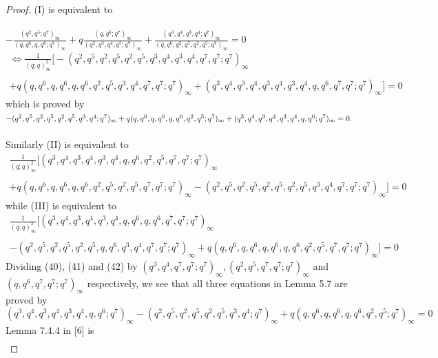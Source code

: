 \documentclass[10pt,reqno]{amsart}
\begin{document}
\begin{proof}
(I) is equivalent to \\ \\$-\displaystyle\frac{(q^2,q^5;q^7)_{\infty}}{(q,q^6,q,q^6;q^7)_{\infty}}+q\displaystyle\frac{(q,q^6;q^7)_{\infty}}{(q^2,q^3,q^4,q^5;q^7)_{\infty}}+\displaystyle\frac{(q^3,q^4,q^3,q^4;q^7)_{\infty}}{(q,q^6,q^2,q^5,q^2,q^5;q^7)_{\infty}}=0$ 
\begin{multline}
\Longleftrightarrow\displaystyle\frac{1}{(q;q)_{\infty}^2}\Bigg[-(q^2,q^5,q^2,q^5,q^2,q^5,q^3,q^4,q^3,q^4,q^7,q^7;q^7)_{\infty}\\ \\+q(q,q^6,q,q^6,q,q^6,q^2,q^5,q^3,q^4,q^7,q^7;q^7)_{\infty}+(q^3,q^4,q^3,q^4,q^3,q^4,q^3,q^4,q,q^6,q^7,q^7;q^7)_{\infty}\Bigg]=0
\end{multline}
which is proved by $-(q^2,q^5,q^2,q^5,q^2,q^5,q^3,q^4;q^7)_{\infty}\\ \\+q(q,q^6,q,q^6,q,q^6,q^2,q^5;q^7)_{\infty}+(q^3,q^4,q^3,q^4,q^3,q^4,q,q^6;q^7)_{\infty}=0.$ \\ \\
Similarly (II) is equivalent to 
\begin{multline}
\displaystyle\frac{1}{(q;q)_{\infty}^2}\Bigg[(q^3,q^4,q^3,q^4,q^3,q^4,q,q^6,q^2,q^5,q^7,q^7;q^7)_{\infty}\\ \\+q(q,q^6,q,q^6,q,q^6,q^2,q^5,q^2,q^5,q^7,q^7;q^7)_{\infty}-(q^2,q^5,q^2,q^5,q^2,q^5,q^2,q^5,q^3,q^4,q^7,q^7;q^7)_{\infty}\Bigg]=0
\end{multline}
while (III) is equivalent to 
\begin{multline}
\displaystyle\frac{1}{(q;q)_{\infty}^2}\Bigg[(q^3,q^4,q^3,q^4,q^3,q^4,q,q^6,q,q^6,q^7,q^7;q^7)_{\infty}\\ \\-(q^2,q^5,q^2,q^5,q^2,q^5,q,q^6,q^3,q^4,q^7,q^7;q^7)_{\infty}+q(q,q^6,q,q^6,q,q^6,q,q^6,q^2,q^5,q^7,q^7;q^7)_{\infty}\Bigg]=0
\end{multline}
Dividing (40), (41) and (42) by $(q^3,q^4,q^7,q^7;q^7)_{\infty},(q^2,q^5,q^7,q^7;q^7)_{\infty}$ and $(q,q^6,q^7,q^7;q^7)_{\infty}$ respectively, we see that all three equations in Lemma 5.7 are proved by 
\begin{equation}
    (q^3,q^4,q^3,q^4,q^3,q^4,q,q^6;q^7)_{\infty}-(q^2,q^5,q^2,q^5,q^2,q^5,q^3,q^4;q^7)_{\infty}+q(q,q^6,q,q^6,q,q^6,q^2,q^5;q^7)_{\infty}=0
\end{equation}
Lemma 7.4.4 in [6] is 
\begin{multline*}

\end{multline*}
\end{proof}
\end{document}
